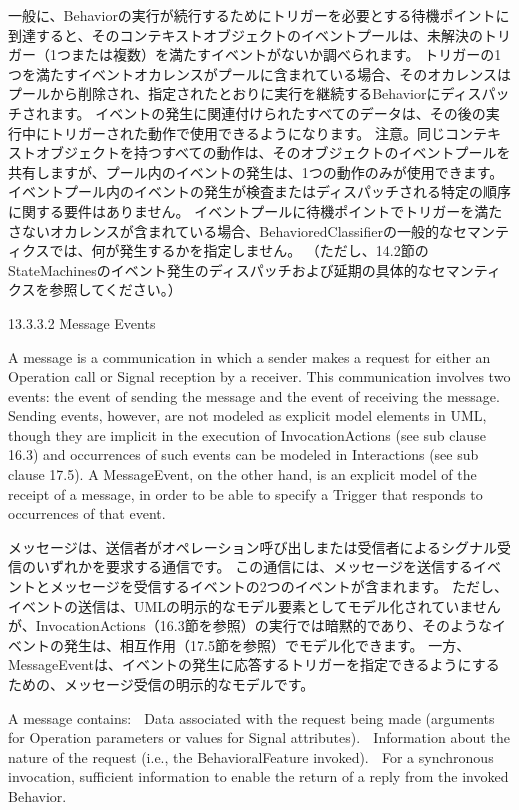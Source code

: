 \documentclass[a4paper,11pt]{ltjsarticle}
\begin{document}
一般に、Behaviorの実行が続行するためにトリガーを必要とする待機ポイントに到達すると、そのコンテキストオブジェクトのイベントプールは、未解決のトリガー（1つまたは複数）を満たすイベントがないか調べられます。
トリガーの1つを満たすイベントオカレンスがプールに含まれている場合、そのオカレンスはプールから削除され、指定されたとおりに実行を継続するBehaviorにディスパッチされます。
イベントの発生に関連付けられたすべてのデータは、その後の実行中にトリガーされた動作で使用できるようになります。
注意。同じコンテキストオブジェクトを持つすべての動作は、そのオブジェクトのイベントプールを共有しますが、プール内のイベントの発生は、1つの動作のみが使用できます。
イベントプール内のイベントの発生が検査またはディスパッチされる特定の順序に関する要件はありません。
イベントプールに待機ポイントでトリガーを満たさないオカレンスが含まれている場合、BehavioredClassifierの一般的なセマンティクスでは、何が発生するかを指定しません。
（ただし、14.2節のStateMachinesのイベント発生のディスパッチおよび延期の具体的なセマンティクスを参照してください。）


13.3.3.2 Message Events


A message is a communication in which a sender makes a request for either an Operation call or Signal reception by a receiver. 
This communication involves two events: the event of sending the message and the event of receiving the message. 
Sending events, however, are not modeled as explicit model elements in UML, though they are implicit in the execution of InvocationActions (see sub clause 16.3) and occurrences of such events can be modeled in Interactions (see sub clause 17.5). 
A MessageEvent, on the other hand, is an explicit model of the receipt of a message, in order to be able to specify a Trigger that responds to occurrences of that event.

メッセージは、送信者がオペレーション呼び出しまたは受信者によるシグナル受信のいずれかを要求する通信です。
この通信には、メッセージを送信するイベントとメッセージを受信するイベントの2つのイベントが含まれます。
ただし、イベントの送信は、UMLの明示的なモデル要素としてモデル化されていませんが、InvocationActions（16.3節を参照）の実行では暗黙的であり、そのようなイベントの発生は、相互作用（17.5節を参照）でモデル化できます。
一方、MessageEventは、イベントの発生に応答するトリガーを指定できるようにするための、メッセージ受信の明示的なモデルです。


A message contains:
 Data associated with the request being made (arguments for Operation parameters or values for Signal attributes).
 Information about the nature of the request (i.e., the BehavioralFeature invoked).
 For a synchronous invocation, sufficient information to enable the return of a reply from the invoked Behavior.
\end{document}
